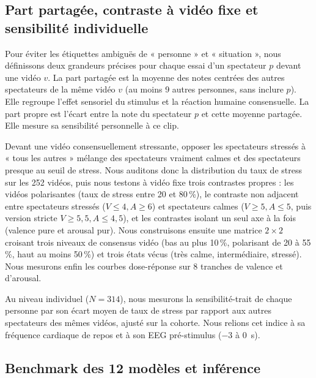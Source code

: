 \documentclass[10pt]{article}
\begin{document}
\subsection{Part partagée, contraste à vidéo fixe et sensibilité individuelle}

Pour éviter les étiquettes ambiguës de « personne » et « situation », nous définissons deux grandeurs précises pour chaque essai d'un spectateur $p$ devant une vidéo $v$. La part partagée est la moyenne des notes centrées des autres spectateurs de la même vidéo $v$ (au moins 9 autres personnes, sans inclure $p$). Elle regroupe l'effet sensoriel du stimulus et la réaction humaine consensuelle. La part propre est l'écart entre la note du spectateur $p$ et cette moyenne partagée. Elle mesure sa sensibilité personnelle à ce clip.

Devant une vidéo consensuellement stressante, opposer les spectateurs stressés à « tous les autres » mélange des spectateurs vraiment calmes et des spectateurs presque au seuil de stress. Nous auditons donc la distribution du taux de stress sur les 252 vidéos, puis nous testons à vidéo fixe trois contrastes propres : les vidéos polarisantes (taux de stress entre 20 et 80\,\%), le contraste non adjacent entre spectateurs stressés ($V \le 4, A \ge 6$) et spectateurs calmes ($V \ge 5, A \le 5$, puis version stricte $V \ge 5{,}5, A \le 4{,}5$), et les contrastes isolant un seul axe à la fois (valence pure et arousal pur). Nous construisons ensuite une matrice $2 \times 2$ croisant trois niveaux de consensus vidéo (bas au plus 10\,\%, polarisant de 20 à 55\,\%, haut au moins 50\,\%) et trois états vécus (très calme, intermédiaire, stressé). Nous mesurons enfin les courbes dose-réponse sur 8 tranches de valence et d'arousal.

Au niveau individuel ($N = 314$), nous mesurons la sensibilité-trait de chaque personne par son écart moyen de taux de stress par rapport aux autres spectateurs des mêmes vidéos, ajusté sur la cohorte. Nous relions cet indice à sa fréquence cardiaque de repos et à son EEG pré-stimulus ($-3$ à $0$~s).

\subsection{Benchmark des 12 modèles et inférence}
\end{document}
